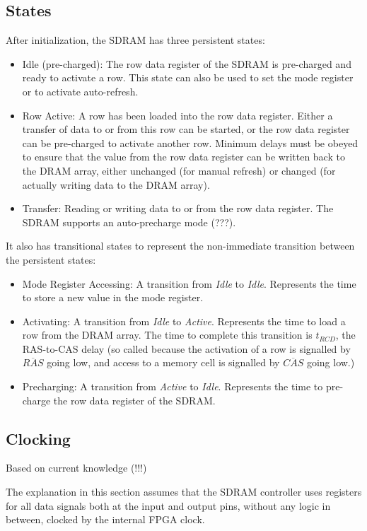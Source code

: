\subsection{States}

After initialization, the SDRAM has three persistent states:
\begin{itemize}
\item Idle (pre-charged): The row data register of the SDRAM is pre-charged and ready to activate a row. This state can also be used to set the mode register or to activate auto-refresh.
\item Row Active: A row has been loaded into the row data register. Either a transfer of data to or from this row can be started, or the row data register can be pre-charged to activate another row. Minimum delays must be obeyed to ensure that the value from the row data register can be written back to the DRAM array, either unchanged (for manual refresh) or changed (for actually writing data to the DRAM array).
\item Transfer: Reading or writing data to or from the row data register. The SDRAM supports an auto-precharge mode (???).
\end{itemize}

It also has transitional states to represent the non-immediate transition between the persistent states:
\begin{itemize}
\item Mode Register Accessing: A transition from {\it Idle} to {\it Idle}. Represents the time to store a new value in the mode register.
\item Activating: A transition from {\it Idle} to {\it Active}. Represents the time to load a row from the DRAM array. The time to complete this transition is $t_{RCD}$, the RAS-to-CAS delay (so called because the activation of a row is signalled by $\overline{RAS}$ going low, and access to a memory cell is signalled by $\overline{CAS}$ going low.)
\item Precharging: A transition from {\it Active} to {\it Idle}. Represents the time to pre-charge the row data register of the SDRAM.
\end{itemize}

\subsection{Clocking}

Based on current knowledge (!!!)

The explanation in this section assumes that the SDRAM controller uses registers for all data signals both at the input and output pins, without any logic in between, clocked by the internal FPGA clock.

